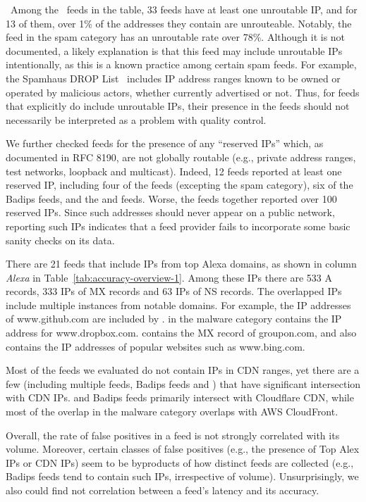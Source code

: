 \finding\ Among the \numipfeeds\ feeds in the table, 33 feeds have at
least one unroutable IP, and for 13 of them, over 1\% of the addresses
they contain are unrouteable. Notably, the {\feedetiprep} feed in the
spam category has an unroutable rate over 78\%.  Although it is not
documented, a likely explanation is that this feed may include unroutable
IPs intentionally, as this is a known practice among certain spam
feeds. For example, the Spamhaus DROP List~\cite{Spamhaus} includes IP
address ranges known to be owned or operated by malicious actors,
whether currently advertised or not. Thus, for feeds that explicitly
do include unroutable IPs, their presence in the feeds should not
necessarily be interpreted as a problem with quality control.

We further checked feeds for the presence of any ``reserved IPs''
which, as documented in RFC 8190, are not globally routable (e.g., private
address ranges, test networks, loopback and multicast).  Indeed,
12 feeds reported at least one reserved IP, including four of the
{\feedetiprep} feeds (excepting the spam category), six of the Badips
feeds, and the {\feedFBAdmin} and {\feeddshield} feeds. Worse, the
{\feedetiprep} feeds together reported over 100 reserved IPs. Since
such addresses should never appear on a public network,
reporting such IPs indicates that a feed provider fails to
incorporate some basic sanity checks on its data.

There are 21 feeds that include IPs from top Alexa domains, as shown
in column \textit{Alexa} in Table~\ref{tab:accuracy-overview-1}. Among
these IPs there are 533 A records, 333 IPs of MX records and 63 IPs of
NS records.  The overlapped IPs include multiple instances from
notable domains. For example, the IP addresses of www.github.com are
included by {\feedmalcode}.  {\feedetiprep} in the malware category
contains the IP address for www.dropbox.com.  {\feedalienvault}
contains the MX record of groupon.com, and {\feedbadipssh} also
contains the IP addresses of popular websites such as www.bing.com.

Most of the feeds we evaluated do not contain IPs in CDN ranges, yet
there are a few (including multiple {\feedetiprep} feeds, Badips feeds
and {\feedalienvault}) that have significant intersection with CDN
IPs. {\feedalienvault} and Badips feeds primarily intersect with
Cloudflare CDN, while most of the overlap in the {\feedetiprep} malware
category overlaps with AWS CloudFront.

Overall, the rate of false positives in a feed is not strongly
correlated with its volume.  Moreover, certain classes of false
positives (e.g., the presence of Top Alex IPs or CDN IPs) seem to
be byproducts of how distinct feeds are collected (e.g., Badips
feeds tend to contain such IPs, irrespective of volume).
Unsurprisingly, we also could find not correlation between a feed's
latency and its accuracy.


